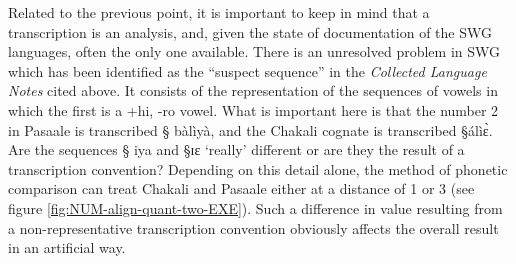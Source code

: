 Related to the previous point, it is important to keep in mind that a 
transcription is an analysis, and,  given the state of documentation of the SWG
languages, often the only one available. There is an unresolved problem
in SWG which has been identified as the ``suspect sequence''  in    the 
\textit{Collected Language Notes} cited above. It consists of the representation
of the sequences of vowels in which the first is a {\sc +hi, -ro} vowel.
What is important here is that  the number 2 in Pasaale is transcribed {\S
bàlìyà},
and the Chakali cognate  is transcribed  {\S álìɛ̀}. Are the sequences {\S
iya} and {\S ɪɛ} `really' different or are they the result of  a transcription
convention?  Depending on this detail alone, the method of phonetic comparison
can treat 
Chakali
and Pasaale  either at a distance of 1 or 3  (see figure
\ref{fig:NUM-align-quant-two-EXE}).  Such a difference
in value resulting from a non-representative transcription
convention  obviously affects the overall result in an artificial way. 


















